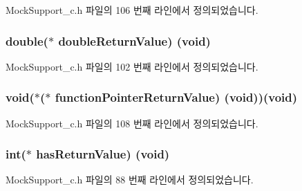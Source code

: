 Mock\+Support\+\_\+c.\+h 파일의 106 번째 라인에서 정의되었습니다.

\subsubsection[{\texorpdfstring{double\+Return\+Value}{doubleReturnValue}}]{\setlength{\rightskip}{0pt plus 5cm}double($\ast$ double\+Return\+Value) (void)}\hypertarget{struct_s_mock_actual_call__c_a7ecb3db593fac63b35159a89a7dfeed2}{}\label{struct_s_mock_actual_call__c_a7ecb3db593fac63b35159a89a7dfeed2}


Mock\+Support\+\_\+c.\+h 파일의 102 번째 라인에서 정의되었습니다.

\subsubsection[{\texorpdfstring{function\+Pointer\+Return\+Value}{functionPointerReturnValue}}]{\setlength{\rightskip}{0pt plus 5cm}void($\ast$($\ast$ function\+Pointer\+Return\+Value) (void))(void)}\hypertarget{struct_s_mock_actual_call__c_a808d27a78eeec5e62fe36759b8da147b}{}\label{struct_s_mock_actual_call__c_a808d27a78eeec5e62fe36759b8da147b}


Mock\+Support\+\_\+c.\+h 파일의 108 번째 라인에서 정의되었습니다.

\subsubsection[{\texorpdfstring{has\+Return\+Value}{hasReturnValue}}]{\setlength{\rightskip}{0pt plus 5cm}int($\ast$ has\+Return\+Value) (void)}\hypertarget{struct_s_mock_actual_call__c_abf2a8673b027d72522a797f0a1c11cf4}{}\label{struct_s_mock_actual_call__c_abf2a8673b027d72522a797f0a1c11cf4}


Mock\+Support\+\_\+c.\+h 파일의 88 번째 라인에서 정의되었습니다.

